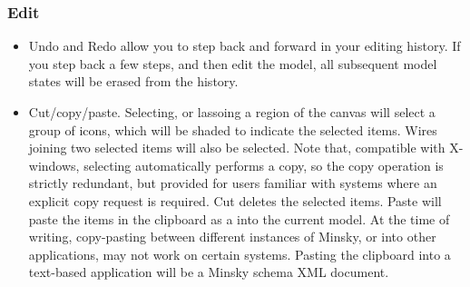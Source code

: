 \subsubsection{Edit}
\label{Edit}

\begin{itemize}
\item\label{edit:undo} Undo and Redo allow you to step back and forward in your editing
history. If you step back a few steps, and then edit the model, all
subsequent model states will be erased from the history.

\item\label{edit:copy} Cut/copy/paste. Selecting, or lassoing a region
of the canvas will select a group of icons, which will be shaded to
indicate the selected items. Wires joining two selected items will
also be selected. Note that, compatible with X-windows, selecting
automatically performs a copy, so the copy operation is strictly
redundant, but provided for users familiar with systems where an
explicit copy request is required. Cut deletes the selected
items. Paste will paste the items in the clipboard as a
 into the current model. At the time of writing,
copy-pasting between different instances of Minsky, or into other
applications, may not work on certain systems. Pasting the clipboard
into a text-based application will be a Minsky schema XML document.


\end{itemize}

